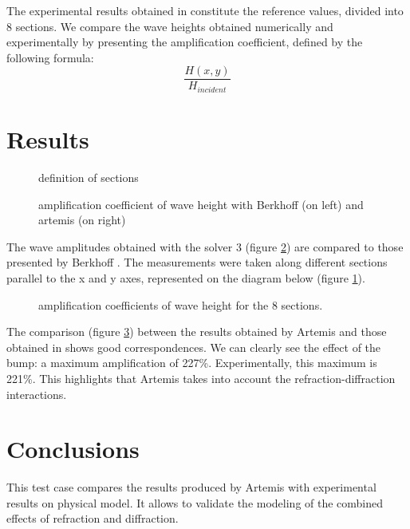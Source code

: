 The experimental results obtained in \cite{berkhoff1982} constitute the reference values,
divided into 8 sections. We compare the wave heights obtained numerically and experimentally by
presenting the amplification coefficient, defined by the following formula:
$$
\frac{H(x,y)}{H_{incident}}
$$

\section{Results}

\begin{figure}[h]
\begin{center}
\end{center}
\caption{definition of sections}
\label{fig:defsection_bosse_elipt}
\end{figure}

\begin{figure}[h]
\begin{center}
\end{center}
\caption{ amplification coefficient of wave height with Berkhoff (on left) and artemis (on right)}
\label{fig:bosse_elipt_resu_comp}
\end{figure}

The wave amplitudes obtained with the solver 3 (figure \ref{fig:bosse_elipt_resu_comp}) are compared to
those presented by
Berkhoff \cite{berkhoff1982}. The measurements were taken along different sections parallel to
the x and y axes, represented on the diagram below (figure \ref{fig:defsection_bosse_elipt}).


\begin{figure}[h]
\begin{center}
\end{center}
\caption{amplification coefficients of wave height for the 8 sections.}
\label{fig:ressections_bosse}
\end{figure}

The comparison (figure \ref{fig:ressections_bosse}) between the results obtained by
Artemis and those obtained in \cite{berkhoff1982} shows good correspondences. We can
clearly see the effect of the bump: a maximum
amplification of 227\%. Experimentally, this maximum is 221\%. This highlights that
Artemis takes into account the refraction-diffraction interactions.


\section{Conclusions}
This test case compares the results produced by Artemis with experimental results on
physical model. It allows to validate the modeling of the combined effects of refraction and
diffraction.
